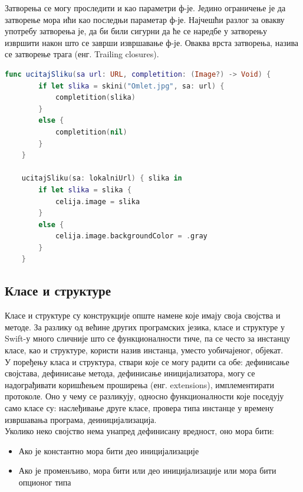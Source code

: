 \documentclass[12pt,oneside]{memoir}
\begin{document}
\indent Затворења се могу проследити и као параметри ф-је. Једино ограничење је да затворење мора ићи као последњи параметар ф-је. Најчешћи разлог за овакву употребу затворења је, да би били сигурни да ће се наредбе у затворењу извршити након што се заврши извршавање ф-је. Оваква врста затворења, назива се затворење трага (енг. Trailing closures). 

\begin{lstlisting}[caption=\textit{{Затворење трага}}, label={lst:Затворење трага}, language=Swift, frame=single]
    func ucitajSliku(sa url: URL, completition: (Image?) -> Void) {
        if let slika = skini("Omlet.jpg", sa: url) {
            completition(slika)
        }
        else {
            completition(nil)
        }
    }
    
    ucitajSliku(sa: lokalniUrl) { slika in
        if let slika = slika {
            celija.image = slika
        }
        else {
            celija.image.backgroundColor = .gray
        }
    }
\end{lstlisting}

\subsection{Класе и структуре}

\indent Класе и структуре су конструкције опште намене које имају своја својства и методе. За разлику од већине других програмских језика, класе и структуре у Swift-у много сличније што се функционалности тиче, па се често за инстанцу класе, као и структуре, користи назив инстанца, уместо уобичајеног, објекат. 
\\
\indent У поређењу класа и структура, ствари које се могу радити са обе: дефинисање својстава, дефинисање метода, дефинисање иницијализатора, могу се надограђивати коришћењем проширења (енг. extensions), имплементирати протоколе. 
Оно у чему се разликују, односно функционалности које поседују само класе су: наслеђивање друге класе, провера типа инстанце у времену извршавања програма, деиницијализација.
\\
\indent Уколико неко својство нема унапред дефинисану вредност, оно мора бити: 
\begin{itemize}
    \item Ако је константно мора бити део иницијализације
    \item Ако је променљиво, мора бити или део иницијализације или мора бити опционог типа
\end{itemize}
\end{document}
